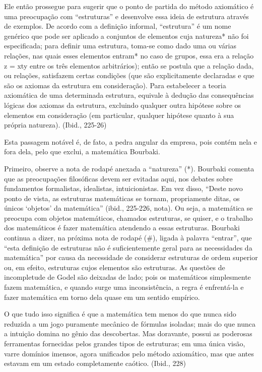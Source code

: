 \documentclass[a4paper,12pt]{article}[abntex2]
\begin{document}
Ele então prossegue para sugerir que o ponto de partida do método axiomático é uma preocupação com “estruturas” e desenvolve essa ideia de estrutura através de exemplos. De acordo com a definição informal, “estrutura” é um nome genérico que pode ser aplicado a conjuntos de elementos cuja natureza* não foi especificada; para definir uma estrutura, toma-se como dado uma ou várias relações, nas quais esses elementos entram* no caso de grupos, essa era a relação z = xty entre os três elementos arbitrários); então se postula que a relação dada, ou relações, satisfazem certas condições (que são explicitamente declaradas e que são os axiomas da estrutura em consideração). Para estabelecer a teoria axiomática de uma determinada estrutura, equivale à dedução das consequências lógicas dos axiomas da estrutura, excluindo qualquer outra hipótese sobre os elementos em consideração (em particular, qualquer hipótese quanto à sua própria natureza). (Ibid., 225-26)

Esta passagem notável é, de fato, a pedra angular da empresa, pois contém nela e fora dela, pelo que exclui, a matemática Bourbaki.

Primeiro, observe a nota de rodapé anexada a “natureza” (*). Bourbaki comenta que as preocupações filosóficas devem ser evitadas aqui, nos debates sobre fundamentos formalistas, idealistas, intuicionistas. Em vez disso, “Deste novo ponto de vista, as estruturas matemáticas se tornam, propriamente ditas, os únicos ‘objetos’ da matemática” (ibid., 225-226, nota). Ou seja, a matemática se preocupa com objetos matemáticos, chamados estruturas, se quiser, e o trabalho dos matemáticos é fazer matemática atendendo a essas estruturas. Bourbaki continua a dizer, na próxima nota de rodapé (#), ligada à palavra “entrar”, que “esta definição de estruturas não é suficientemente geral para as necessidades da matemática” por causa da necessidade de considerar estruturas de ordem superior ou, em efeito, estruturas cujos elementos são estruturas. As questões de incompletude de Godel são deixadas de lado; pois os matemáticos simplesmente fazem matemática, e quando surge uma inconsistência, a regra é enfrentá-la e fazer matemática em torno dela quase em um sentido empírico.

O que tudo isso significa é que a matemática tem menos do que nunca sido reduzida a um jogo puramente mecânico de fórmulas isoladas; mais do que nunca a intuição domina no gênio das descobertas. Mas doravante, possui as poderosas ferramentas fornecidas pelos grandes tipos de estruturas; em uma única visão, varre domínios imensos, agora unificados pelo método axiomático, mas que antes estavam em um estado completamente caótico. (Ibid., 228)
\end{document}
